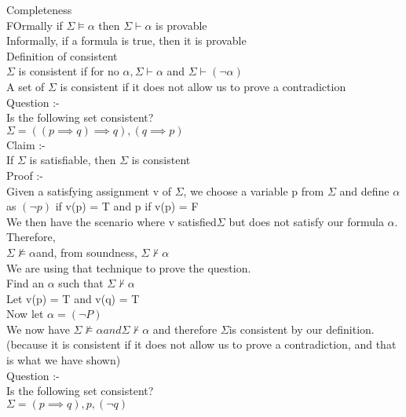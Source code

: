 \documentclass[12pt,oneside,notitlepage]{book}
\theoremstyle{definition}
\begin{document}
Completeness \\
FOrmally if $\Sigma \vDash \alpha$ then $\Sigma \vdash \alpha$ is provable \\
Informally, if a formula is true, then it is provable \\

Definition of consistent \\
$\Sigma$ is consistent if for no $\alpha, \Sigma \vdash \alpha$ and $\Sigma \vdash (\neg \alpha)$ \\
A set of $\Sigma$ is consistent if it does not allow us to prove a contradiction \\

Question :- \\
Is the following set consistent? \\
$\Sigma = { ((p \implies q) \implies q), (q \implies p) }$ \\

Claim :- \\
If $\Sigma$ is satisfiable, then $\Sigma$ is consistent \\
Proof :- \\
Given a satisfying assignment v of $\Sigma$, we choose a variable p from $\Sigma$ and define $\alpha$ as $(\neg p)$ if v(p) = T and p if v(p) = F \\

We then have the scenario where v satisfied$ \Sigma$ but does not satisfy our formula $\alpha$. Therefore, \\
$\Sigma \not \vDash \alpha $and, from soundness, $\Sigma \not \vdash \alpha$ \\

We are using that technique to prove the question. \\
Find an $\alpha$ such that $\Sigma \not \vdash \alpha$ \\
Let v(p) = T and v(q) = T \\
Now let $\alpha = (\neg P)$ \\

We now have $\Sigma \not \vDash \alpha and \Sigma \not \vdash \alpha$ and therefore $\Sigma $is consistent by our definition. (because it is consistent if it does not allow us to prove a contradiction, and that is what we have shown) \\

Question :-  \\
Is the following set consistent? \\
$\Sigma = { (p \implies q), p, (\neg q) }$ \\
\end{document}
